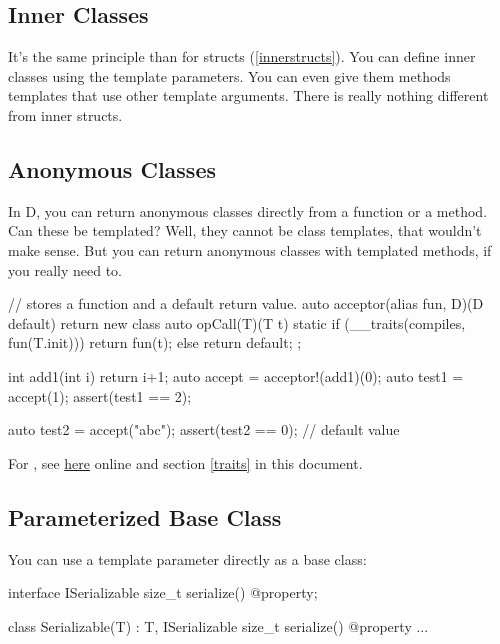 \subsection{Inner Classes}\label{innerclasses}

It's the same principle than for structs (\ref{innerstructs}). You can define inner classes using the template parameters. You can even give them methods templates that use other template arguments. There is really nothing different from inner structs.

\subsection{Anonymous Classes}\label{anonymousclasses}

In D, you can return anonymous classes directly from a function or a method. Can these be templated? Well, they cannot be class templates, that wouldn't make sense. But you can return anonymous classes with templated methods, if you really need to.

\begin{dcode}
// stores a function and a default return value.
auto acceptor(alias fun, D)(D default)
{
    return new class 
    { 
        auto opCall(T)(T t)
        {
            static if (__traits(compiles, fun(T.init)))
                return fun(t); 
            else
                return default;
        }
    };
}

int add1(int i) { return i+1;}
auto accept = acceptor!(add1)(0);
auto test1 = accept(1); 
assert(test1 == 2);

auto test2 = accept("abc");
assert(test2 == 0); // default value
\end{dcode}


For , see \href{www.dlang.org/traits.html}{here} online and section \ref{traits} in this document.

\subsection{Parameterized Base Class}

You can use a template parameter directly as a base class:

\begin{dcode}
interface ISerializable
{
    size_t serialize() @property;
}

class Serializable(T) : T, ISerializable
{
    size_t serialize() @property { ... }
} 
\end{dcode}

